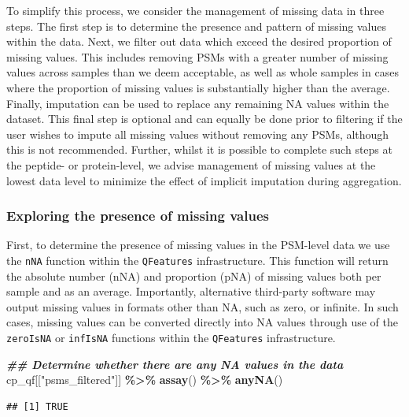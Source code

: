 \documentclass[9pt,a4paper,]{extarticle}
\newenvironment{Shaded}{\begin{snugshade}}{\end{snugshade}}
\newcommand{\DocumentationTok}[1]{\textcolor[rgb]{0.56,0.35,0.01}{\textbf{\textit{#1}}}}
\newcommand{\FunctionTok}[1]{\textcolor[rgb]{0.13,0.29,0.53}{\textbf{#1}}}
\newcommand{\NormalTok}[1]{#1}
\newcommand{\SpecialCharTok}[1]{\textcolor[rgb]{0.81,0.36,0.00}{\textbf{#1}}}
\newcommand{\StringTok}[1]{\textcolor[rgb]{0.31,0.60,0.02}{#1}}
\begin{document}
To simplify this process, we consider the management of missing data in three
steps. The first step is to determine the presence and pattern of missing values
within the data. Next, we filter out data which exceed the desired proportion of
missing values. This includes removing PSMs with a greater number of missing
values across samples than we deem acceptable, as well as whole samples in cases
where the proportion of missing values is substantially higher than the average.
Finally, imputation can be used to replace any remaining NA values within the
dataset. This final step is optional and can equally be done prior to filtering
if the user wishes to impute all missing values without removing any PSMs,
although this is not recommended. Further, whilst it is possible to complete
such steps at the peptide- or protein-level, we advise management of missing
values at the lowest data level to minimize the effect of implicit imputation
during aggregation.

\subsubsection{Exploring the presence of missing values}\label{exploring-the-presence-of-missing-values}

First, to determine the presence of missing values in the PSM-level data we use
the \texttt{nNA} function within the \texttt{QFeatures} infrastructure. This function will
return the absolute number (nNA) and proportion (pNA) of missing values both per
sample and as an average. Importantly, alternative third-party software may
output missing values in formats other than NA, such as zero, or infinite. In
such cases, missing values can be converted directly into NA values through use
of the \texttt{zeroIsNA} or \texttt{infIsNA} functions within the \texttt{QFeatures} infrastructure.

\begin{Shaded}
\begin{Highlighting}[]
\DocumentationTok{\#\# Determine whether there are any NA values in the data}
\NormalTok{cp\_qf[[}\StringTok{"psms\_filtered"}\NormalTok{]] }\SpecialCharTok{\%\textgreater{}\%}
  \FunctionTok{assay}\NormalTok{() }\SpecialCharTok{\%\textgreater{}\%}
  \FunctionTok{anyNA}\NormalTok{()}
\end{Highlighting}
\end{Shaded}

\begin{verbatim}
## [1] TRUE
\end{verbatim}
\end{document}
